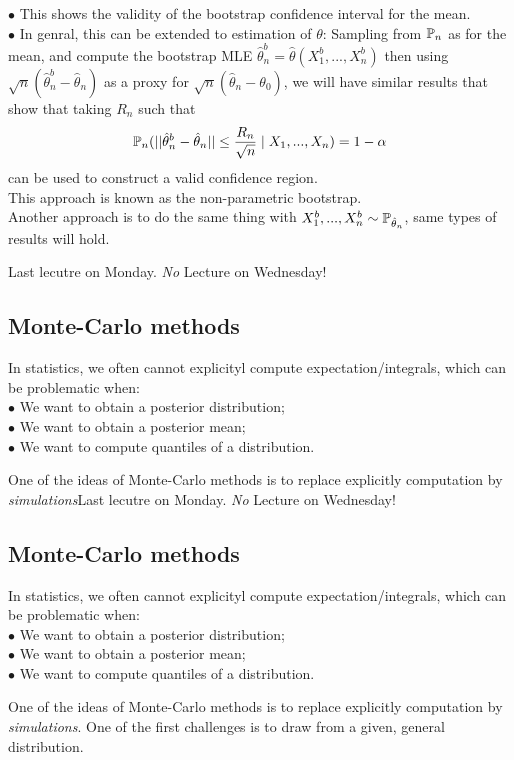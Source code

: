 \documentclass[a4paper]{article}
\begin{document}
\begin{rem}
$\bullet$ This shows the validity of the bootstrap confidence interval for the mean.\\
$\bullet$ In genral, this can be extended to estimation of $\theta$: Sampling from $\P_n$ as for the mean, and compute the bootstrap MLE $\hat{\theta}_n^b = \hat{\theta} (X_1^b,...,X_n^b)$ then using $\sqrt{n}(\hat{\theta}_n^b - \hat{\theta}_n)$ as a proxy for $\sqrt{n} (\hat{\theta}_n - \theta_0)$, we will have similar results that show that taking $R_n$ such that $$\P_n(||\hat{\theta}_n^b - \hat{\theta}_n|| \leq \frac{R_n}{\sqrt{n}} \mid X_1,...,X_n) = 1-\alpha$$ can be used to construct a valid confidence region.\\
This approach is known as the non-parametric bootstrap.\\
Another approach is to do the same thing with $X_1^b,...,X_n^b \sim \P_{\hat{\theta}_n}$, same types of results will hold.
\end{rem}

Last lecutre on Monday. \emph{No} Lecture on Wednesday!

\subsection{Monte-Carlo methods}
In statistics, we often cannot explicityl compute expectation/integrals, which can be problematic when:\\
$\bullet$ We want to obtain a posterior distribution;\\
$\bullet$ We want to obtain a posterior mean;\\
$\bullet$ We want to compute quantiles of a distribution.

One of the ideas of Monte-Carlo methods is to replace explicitly computation by \emph{simulations}Last lecutre on Monday. \emph{No} Lecture on Wednesday!

\subsection{Monte-Carlo methods}
In statistics, we often cannot explicityl compute expectation/integrals, which can be problematic when:\\
$\bullet$ We want to obtain a posterior distribution;\\
$\bullet$ We want to obtain a posterior mean;\\
$\bullet$ We want to compute quantiles of a distribution.

One of the ideas of Monte-Carlo methods is to replace explicitly computation by \emph{simulations}. One of the first challenges is to draw from a given, general distribution.
\end{document}
